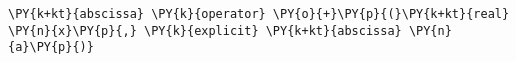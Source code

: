\begin{Verbatim}[commandchars=\\\{\}]
  \PY{k+kt}{abscissa} \PY{k}{operator} \PY{o}{+}\PY{p}{(}\PY{k+kt}{real} \PY{n}{x}\PY{p}{,} \PY{k}{explicit} \PY{k+kt}{abscissa} \PY{n}{a}\PY{p}{)}
\end{Verbatim}
